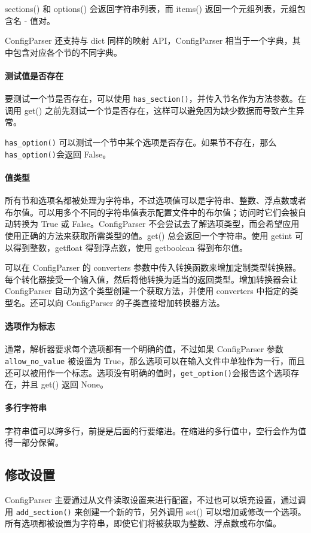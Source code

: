 sections() 和 options() 会返回字符串列表，而 items() 返回一个元组列表，元组包含名 - 值对。

ConfigParser 还支持与 dict 同样的映射 API，ConfigParser 相当于一个字典，其中包含对应各个节的不同字典。

\paragraph{测试值是否存在} 要测试一个节是否存在，可以使用 \verb|has_section()|，并传入节名作为方法参数。在调用 get() 之前先测试一个节是否存在，这样可以避免因为缺少数据而导致产生异常。

\verb|has_option()| 可以测试一个节中某个选项是否存在。如果节不存在，那么 \verb|has_option()|会返回 False。

\paragraph{值类型} 所有节和选项名都被处理为字符串，不过选项值可以是字符串、整数、浮点数或者布尔值。可以用多个不同的字符串值表示配置文件中的布尔值；访问时它们会被自动转换为 True 或 False。ConfigParser 不会尝试去了解选项类型，而会希望应用使用正确的方法来获取所需类型的值。get() 总会返回一个字符串。使用 getint 可以得到整数，getfloat 得到浮点数，使用 getboolean 得到布尔值。

可以在 ConfigParser 的 converters 参数中传入转换函数来增加定制类型转换器。每个转化器接受一个输入值，然后将他转换为适当的返回类型。增加转换器会让 ConfigParser 自动为这个类型创建一个获取方法，并使用 converters 中指定的类型名。还可以向 ConfigParser 的子类直接增加转换器方法。

\paragraph{选项作为标志} 通常，解析器要求每个选项都有一个明确的值，不过如果 ConfigParser 参数 \verb|allow_no_value| 被设置为 True，那么选项可以在输入文件中单独作为一行，而且还可以被用作一个标志。选项没有明确的值时，\verb|get_option()|会报告这个选项存在，并且 get() 返回 None。
\paragraph{多行字符串} 字符串值可以跨多行，前提是后面的行要缩进。在缩进的多行值中，空行会作为值得一部分保留。

\subsection{修改设置}
ConfigParser 主要通过从文件读取设置来进行配置，不过也可以填充设置，通过调用 \verb|add_section()| 来创建一个新的节，另外调用 set() 可以增加或修改一个选项。所有选项都被设置为字符串，即使它们将被获取为整数、浮点数或布尔值。

